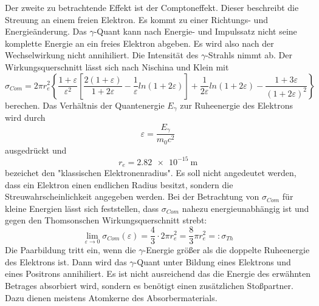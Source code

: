 \noindent Der zweite zu betrachtende Effekt ist der Comptoneffekt.
Dieser beschreibt die Streuung an einem freien Elektron.
Es kommt zu einer Richtungs- und Energieänderung.
Das $\gamma$-Quant kann nach Energie- und Impulssatz nicht seine komplette Energie an ein freies Elektron abgeben.
Es wird also nach der Wechselwirkung nicht annihiliert.
Die Intensität des $\gamma$-Strahls nimmt ab.
Der Wirkungsquerschnitt lässt sich nach Nischina und Klein mit
\begin{equation}
    \label{eq:klein}
  \sigma_{Com} = 2 \pi r_e^2 \left\{\frac{1+\varepsilon}{\varepsilon^2}\left[\frac{2(1+\varepsilon)}{1+2\varepsilon} - \frac{1}{\varepsilon}ln(1+2\varepsilon)\right] + \frac{1}{2\varepsilon}ln(1+2\varepsilon) - \frac{1+3\varepsilon}{(1+2\varepsilon)^2} \right\}
\end{equation}
berechen.
Das Verhältnis der Quantenergie $E_\gamma$ zur Ruheenergie des Elektrons wird durch
\begin{equation}
  \varepsilon = \frac{E_\gamma}{m_0 c^2}
\end{equation}
ausgedrückt und
\begin{equation}
  r_e= \SI{2.82e-15}{\meter}
\end{equation}
bezeichet den "klassischen Elektronenradius".
Es soll nicht angedeutet werden, dass ein Elektron einen endlichen Radius besitzt, sondern die Streuwahrscheinlichkeit angegeben werden.
Bei der Betrachtung von $\sigma_{Com}$ für kleine Energien lässt sich feststellen, dass $\sigma_{Com}$ nahezu energieunabhängig ist und gegen den Thomsonschen Wirkungsquerschnitt strebt:
\begin{equation}
  \lim_{\varepsilon \rightarrow 0} \sigma_{Com}(\varepsilon) = \frac{4}{3} \cdot 2 \pi r_e^2 = \frac{8}{3}\pi r_e^2 =: \sigma_{Th}
\end{equation}
Die Paarbildung tritt ein, wenn die $\gamma$-Energie größer als die doppelte Ruheenergie des Elektrons ist.
Dann wird das $\gamma$-Quant unter Bildung eines Elektrons und eines Positrons annihiliert.
Es ist nicht ausreichend das die Energie des erwähnten Betrages absorbiert wird, sondern es benötigt einen zusätzlichen Stoßpartner.
Dazu dienen meistens Atomkerne des Absorbermaterials.
%
